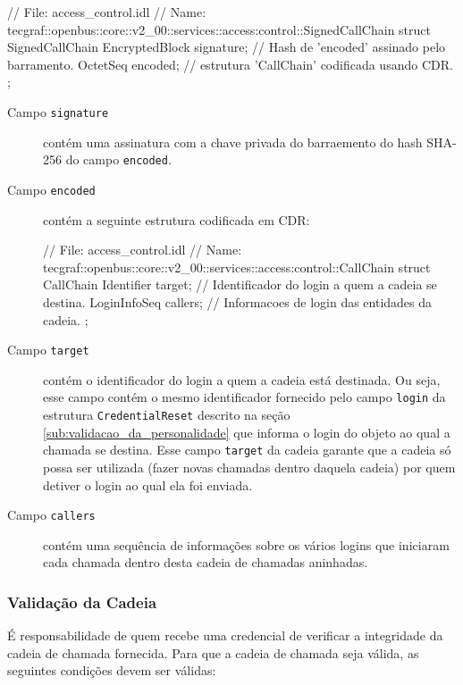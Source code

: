 \documentclass[]{article}
\newcommand{\code}[1]{\texttt{#1}}
\begin{document}
\begin{samplecode}[language={[CORBA]idl}]
// File: access_control.idl
// Name: tecgraf::openbus::core::v2_00::services::access:control::SignedCallChain
struct SignedCallChain {
	EncryptedBlock signature; // Hash de 'encoded' assinado pelo barramento.
	OctetSeq encoded;         // estrutura 'CallChain' codificada usando CDR.
};
\end{samplecode}

\begin{description}
	\item[Campo \code{signature}] contém uma assinatura com a chave privada do barraemento do hash SHA-256 do campo \code{encoded}.
	
	\item[Campo \code{encoded}] contém a seguinte estrutura codificada em CDR:
	\begin{samplecode}[language={[CORBA]idl}]
// File: access_control.idl
// Name: tecgraf::openbus::core::v2_00::services::access:control::CallChain
struct CallChain {
	Identifier target;    // Identificador do login a quem a cadeia se destina.
	LoginInfoSeq callers; // Informacoes de login das entidades da cadeia.
};
	\end{samplecode}
	
	\item[Campo \code{target}] contém o identificador do login a quem a cadeia está destinada.
	Ou seja, esse campo contém o mesmo identificador fornecido pelo campo \code{login} da estrutura \code{CredentialReset} descrito na seção \ref{sub:validacao_da_personalidade} que informa o login do objeto ao qual a chamada se destina.
	Esse campo \code{target} da cadeia garante que a cadeia só possa ser utilizada (fazer novas chamadas dentro daquela cadeia) por quem detiver o login ao qual ela foi enviada.
	
	\item[Campo \code{callers}] contém uma sequência de informações sobre os vários logins que iniciaram cada chamada dentro desta cadeia de chamadas aninhadas.
\end{description}

\subsubsection{Validação da Cadeia} %
\label{sub:validacao_da_cadeia}

É responsabilidade de quem recebe uma credencial de verificar a integridade da cadeia de chamada fornecida.
Para que a cadeia de chamada seja válida, as seguintes condições devem ser válidas:
\end{document}

